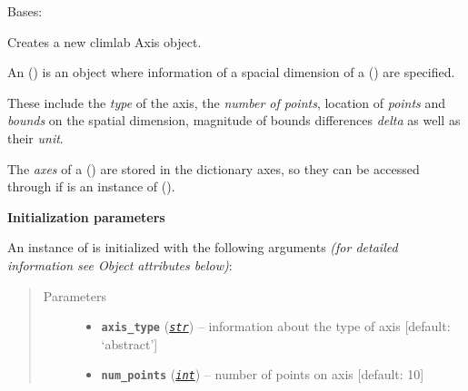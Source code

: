 \documentclass[a4paper,10pt,english]{sphinxmanual}
\begin{document}
\begin{fulllineitems}
\label{api/climlab.domain:climlab.domain.axis.Axis}
Bases: \href{http://docs.python.org/2.7/library/functions.html\#object}{}

Creates a new climlab Axis object.

An {\hyperref[api/climlab.domain:climlab.domain.axis.Axis]{\emph{}}} () is an object where information of a
spacial dimension of a {\hyperref[api/climlab.domain:climlab.domain.domain._Domain]{\emph{}}} () are specified.

These include the \emph{type} of the axis, the \emph{number of points}, location of 
\emph{points} and \emph{bounds} on the spatial dimension, magnitude of bounds
differences \emph{delta} as well as their \emph{unit}.

The \emph{axes} of a {\hyperref[api/climlab.domain:climlab.domain.domain._Domain]{\emph{}}} () are stored in the
dictionary axes, so they can be accessed through  if  
is an instance of {\hyperref[api/climlab.domain:climlab.domain.domain._Domain]{\emph{}}} ().

\textbf{Initialization parameters}

An instance of  is initialized with the following 
arguments \emph{(for detailed information see Object attributes below)}:
\begin{quote}\begin{description}
\item[{Parameters}] \leavevmode\begin{itemize}
\item {} 
\textbf{\texttt{axis\_type}} (\href{http://docs.python.org/2.7/library/functions.html\#str}{\emph{\texttt{str}}}) -- information about the type of axis 
{[}default: `abstract'{]}

\item {} 
\textbf{\texttt{num\_points}} (\href{http://docs.python.org/2.7/library/functions.html\#int}{\emph{\texttt{int}}}) -- number of points on axis
{[}default: 10{]}


\end{itemize}
\end{description}
\end{quote}
\end{fulllineitems}
\end{document}
